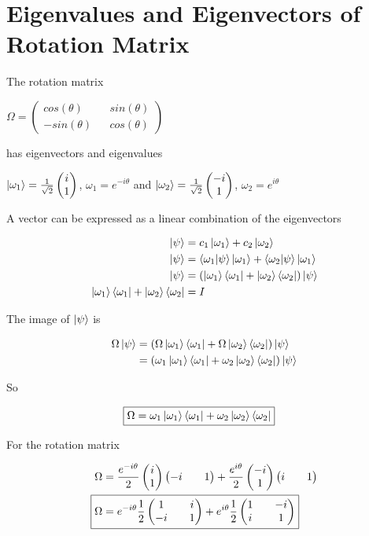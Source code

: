 \section{Eigenvalues and Eigenvectors of Rotation Matrix}
The rotation matrix 
\begin{center}
$
 \Omega = \begin{pmatrix}
 	cos(\theta) && sin(\theta) \\
 	-sin(\theta) && cos(\theta)
 \end{pmatrix}
$ 
\end{center}
has eigenvectors and eigenvalues 
\begin{center}
$
	\ket{\omega_1} = \frac{1}{\sqrt{2}}\begin{pmatrix}i\\1\end{pmatrix}
$, $\omega_1 = e^{-i\theta} $
and
$
	\ket{\omega_2} = \frac{1}{\sqrt{2}}\begin{pmatrix}-i\\1\end{pmatrix}
$, $ \omega_2 = e^{i\theta} $
\end{center}

A vector can be expressed as a linear combination of the eigenvectors

\begin{align*}
	\ket{\psi} &= c_1 \ket{\omega_1} + c_2 \ket{\omega_2} \\
	\ket{\psi} &= \braket{\omega_1}{\psi}\ket{\omega_1} + \braket{\omega_2}{\psi}\ket{\omega_1} \\
	\ket{\psi} &= \left( \ket{\omega_1}\bra{\omega_1} + \ket{\omega_2}\bra{\omega_2} \right)\ket{\psi} \\
	\ket{\omega_1}\bra{\omega_1} + \ket{\omega_2}\bra{\omega_2} &= I
\end{align*}

The image of $\ket{\psi}$ is

\begin{align*}
	\Omega \ket{\psi} &= \left( \Omega \ket{\omega_1}\bra{\omega_1} + \Omega \ket{\omega_2}\bra{\omega_2} \right)\ket{\psi} \\ 
 		&= \left( \omega_1 \ket{\omega_1}\bra{\omega_1} + \omega_2 \ket{\omega_2}\bra{\omega_2} \right)\ket{\psi} \\ 
\end{align*}

So

\begin{align*}
	\Aboxed{\Omega &= \omega_1 \ket{\omega_1}\bra{\omega_1} + \omega_2 \ket{\omega_2}\bra{\omega_2}} 
\end{align*}

For the rotation matrix

\begin{align*}
	\Omega&=\frac{e^{-i\theta}}{2}\ppmat{i\\1}\ppmat{-i&&1}+\frac{e^{i\theta}}{2}\ppmat{-i\\1}\ppmat{i&&1} \\
	\Aboxed{\Omega&=e^{-i\theta}\haf{1}\ppmat{1&&i\\-i&&1}+e^{i\theta}\haf{1}\ppmat{1&&-i\\i&&1}}
\end{align*}

